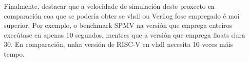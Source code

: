 Finalmente, destacar que a velocidade de simulación deste proxecto en comparación coa que se podería obter se \acrshort{vhdl} ou Verilog fose empregado é moi superior. Por exemplo, o benchmark SPMV na versión que emprega enteiros execútase en apenas 10 segundos, mentres que a versión que emprega floats dura 30. En comparación, unha versión de RISC-V en \acrshort{vhdl} necesita 10 veces máis tempo.

